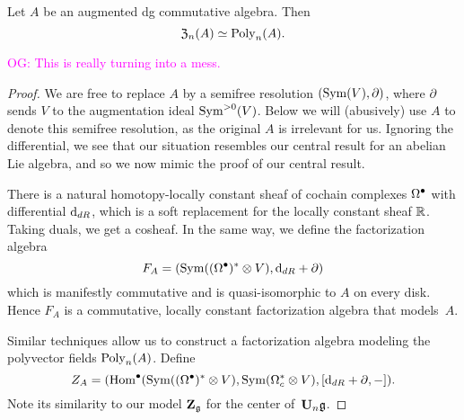 \documentclass[11pt]{amsart}
\numberwithin{equation}{section}
\def\owen{\textcolor{magenta}{OG: }\textcolor{magenta}}
\begin{document}

\begin{prp}
Let $A$ be an augmented dg commutative algebra.
Then 
\[
{\frak Z}_n(A) \simeq {\rm Poly}_n(A).
\]
\end{prp}

\owen{This is really turning into a mess.}

\begin{proof}
We are free to replace $A$ by a semifree resolution $({\rm Sym}(V), \partial)$,
where $\partial$ sends $V$ to the augmentation ideal ${\rm Sym}^{> 0}(V)$.
Below we will (abusively) use $A$ to denote this semifree resolution,
as the original $A$ is irrelevant for us.
Ignoring the differential, we see that our situation resembles our central result for an abelian Lie algebra,
and so we now mimic the proof of our central result.

There is a natural homotopy-locally constant sheaf of cochain complexes $\Omega^\bullet$ with differential ${\rm d}_{dR}$,
which is a soft replacement for the locally constant sheaf $\mathbb R$.
Taking duals, we get a cosheaf.
In the same way, we define the factorization algebra 
\[
F_A = ({\rm Sym}((\Omega^\bullet)^* \otimes V ), {\rm d}_{dR} + \partial) 
\]
which is manifestly commutative and is quasi-isomorphic to $A$ on every disk.
Hence $F_A$ is a commutative, locally constant factorization algebra that models~$A$.

Similar techniques allow us to construct a factorization algebra modeling the polyvector fields ${\rm Poly}_n(A)$.
Define
\[
Z_A = ({\rm Hom}^\bullet({\rm Sym}((\Omega^\bullet)^* \otimes V), {\rm Sym}(\Omega_c^* \otimes V), [{\rm d}_{dR} + \partial,-]).
\]
Note its similarity to our model $\mathbf Z_\mathfrak g$ for the center of~$\mathbf U_n \mathfrak g$.


\end{proof}
\end{document}
